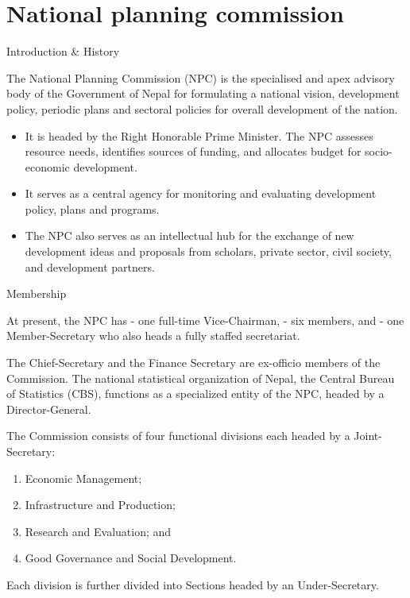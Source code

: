 \documentclass[
  openany]{book}
\providecommand{\tightlist}{%
  \setlength{\itemsep}{0pt}\setlength{\parskip}{0pt}}
\begin{document}
\hypertarget{national-planning-commission}{%
\section{National planning commission}\label{national-planning-commission}}

Introduction \& History

The National Planning Commission (NPC) is the specialised and apex advisory body of the Government of Nepal for formulating a national vision, development policy, periodic plans and sectoral policies for overall development of the nation.

\begin{itemize}
\tightlist
\item
  It is headed by the Right Honorable Prime Minister. The NPC assesses resource needs, identifies sources of funding, and allocates budget for socio-economic development.
\item
  It serves as a central agency for monitoring and evaluating development policy, plans and programs.
\item
  The NPC also serves as an intellectual hub for the exchange of new development ideas and proposals from scholars, private sector, civil society, and development partners.
\end{itemize}

Membership

At present, the NPC has
- one full-time Vice-Chairman,
- six members, and
- one Member-Secretary who also heads a fully staffed secretariat.

The Chief-Secretary and the Finance Secretary are ex-officio members of the Commission. The national statistical organization of Nepal, the Central Bureau of Statistics (CBS), functions as a specialized entity of the NPC, headed by a Director-General.

The Commission consists of four functional divisions each headed by a Joint-Secretary:

\begin{enumerate}
\def\labelenumi{\roman{enumi}.}
\tightlist
\item
  Economic Management;
\item
  Infrastructure and Production;
\item
  Research and Evaluation; and
\item
  Good Governance and Social Development.
\end{enumerate}

Each division is further divided into Sections headed by an Under-Secretary.
\end{document}
